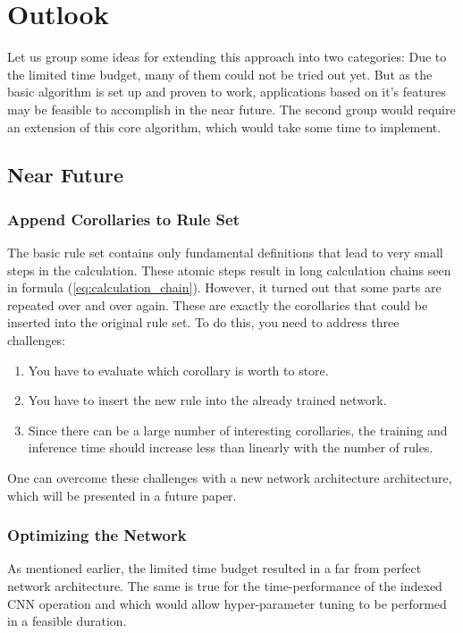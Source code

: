 \documentclass{scrartcl}
\theoremstyle{definition}
\begin{document}
\section{Outlook}

Let us group some ideas for extending this approach into two categories:
Due to the limited time budget, many of them could not be tried out yet.
But as the basic algorithm is set up and proven to work, applications based on it's features may be feasible to accomplish in the near future.
The second group would require an extension of this core algorithm, which would take some time to implement.

\subsection{Near Future}

\subsubsection{Append Corollaries to Rule Set}

The basic rule set contains only fundamental definitions that lead to very small steps in the calculation.
These atomic steps result in long calculation chains seen in formula (\ref{eq:calculation_chain}).
However, it turned out that some parts are repeated over and over again.
These are exactly the corollaries that could be inserted into the original rule set.
To do this, you need to address three challenges:

\begin{enumerate}[label=(\roman*)]
	\item You have to evaluate which corollary is worth to store.
	\item You have to insert the new rule into the already trained network.
	\item Since there can be a large number of interesting corollaries, the training and inference time should increase less than linearly with the number of rules.
\end{enumerate}

One can overcome these challenges with a new network architecture architecture, which will be presented in a future paper.

\subsubsection{Optimizing the Network}

As mentioned earlier, the limited time budget resulted in a far from perfect network architecture.
The same is true for the time-performance of the indexed CNN operation and which would allow hyper-parameter tuning to be performed in a feasible duration.
\end{document}
